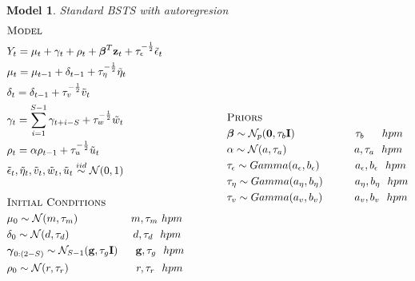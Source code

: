 \documentclass[11pt,twoside]{report}
\newtheorem{model}{Model}
\begin{document}
\begin{model} Standard BSTS with autoregresion\\
\begin{equation*}
\begin{aligned}
&\textsc{Model}\\
&Y_t = \mu_t + \gamma_t + \rho_t + \boldsymbol{\beta}^T\mathbf{z}_t + \tau_\epsilon^{-\frac{1}{2}}\tilde{\epsilon}_t\\
&\mu_t = \mu_{t-1} + \delta_{t-1} +\tau_\eta^{-\frac{1}{2}}\tilde{\eta}_t\\
&\delta_t = \delta_{t-1} + \tau_v^{-\frac{1}{2}}\tilde{v}_t\\
&\gamma_t = \sum_{i=1}^{S-1}\gamma_{t+i-S} + \tau_w^{-\frac{1}{2}}\tilde{w}_t\\
&\rho_t = \alpha\rho_{t-1} + \tau_u^{-\frac{1}{2}}\tilde{u}_t\\
&\tilde{\epsilon}_t, \tilde{\eta}_t, \tilde{v}_t, \tilde{w}_t, \tilde{u}_t \overset{iid}{\sim} \mathcal{N}(0,1)\\
\\
&\textsc{Initial Conditions}\\
&\mu_0 \sim \mathcal{N}(m, \tau_m)\quad \quad \quad \quad \quad m, \tau_m\ hpm\\
&\delta_0 \sim \mathcal{N}(d, \tau_d)\quad \quad \quad \quad \quad \quad d, \tau_d\ \ hpm\\
&\boldsymbol{\gamma}_{0:(2-S)} \sim \mathcal{N}_{S-1}(\mathbf{g}, \tau_g\mathbf{I})\quad\ \ \mathbf{g}, \tau_g\ \ hpm\\
&\rho_0 \sim \mathcal{N}(r, \tau_r)\quad \quad \quad \quad \quad \quad \ r, \tau_r\ \ hpm\\
\\
\end{aligned}
\qquad \qquad
\begin{aligned}[c]
&\textsc{Priors}\\
&\boldsymbol{\beta} \sim \mathcal{N}_p(\mathbf{0}, \tau_b \mathbf{I})\ \ \quad \quad \quad \quad \quad \tau_b\ \quad \ hpm\\
&\alpha \sim \mathcal{N}(a, \tau_a) \ \quad \quad \quad \quad \quad \quad a, \tau_a\ \ hpm\\
&\tau_\epsilon \sim Gamma(a_\epsilon, b_\epsilon)\quad\ \quad \quad a_\epsilon, b_\epsilon\ \ hpm\\
&\tau_\eta \sim Gamma(a_\eta, b_\eta)\quad\quad \quad a_\eta, b_\eta\ \ hpm\\
&\tau_v \sim Gamma(a_v, b_v)\quad\quad \quad a_v, b_v\ \ hpm\\

\end{aligned}
\end{equation*}
\end{model}
\end{document}
